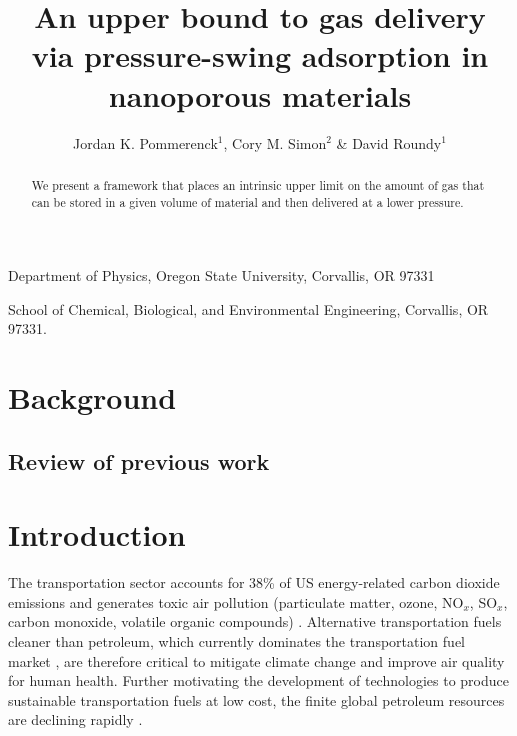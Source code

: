 \documentclass{nature}
\title{An upper bound to gas delivery via pressure-swing adsorption in nanoporous materials}
\author{Jordan K. Pommerenck$^1$, Cory M. Simon$^2$ \& David Roundy$^1$}
\begin{document}
\maketitle

\begin{affiliations}
 \item Department of Physics, Oregon State University, Corvallis, OR 97331
 \item School of Chemical, Biological, and Environmental Engineering,
       Corvallis, OR 97331.
\end{affiliations}

\begin{abstract}
  We present a framework that places an intrinsic upper limit on the amount of
  gas that can be stored in a given volume of material and then delivered at a
  lower pressure.
\end{abstract}

\section{Background}

\subsection{Review of previous work}

\section{Introduction}
The transportation sector accounts for 38\% of US energy-related carbon dioxide emissions \cite{useia} and generates toxic air pollution (particulate matter, ozone, NO$_x$, SO$_x$, carbon monoxide, volatile organic compounds) \cite{caiazzo2013air}. Alternative transportation fuels cleaner than petroleum, which currently dominates the transportation fuel market \cite{davis2009transportation}, are therefore critical to mitigate climate change \cite{mcglade2015geographical} and improve air quality for human health. Further motivating the development of technologies to produce sustainable transportation fuels at low cost, the finite global petroleum resources are declining rapidly \cite{sorrell2010global}.
\end{document}
